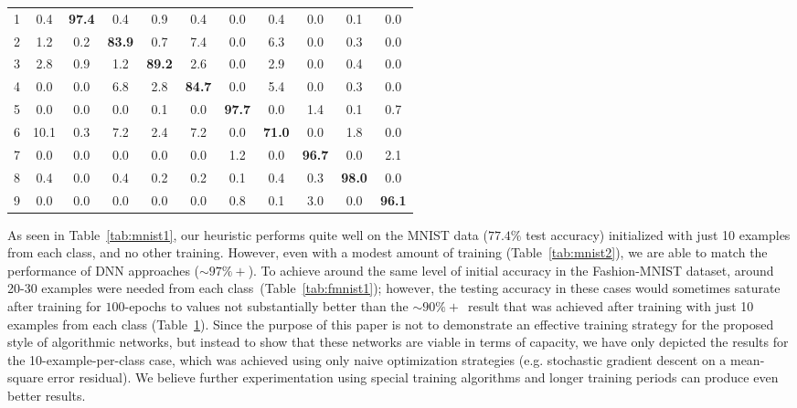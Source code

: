 \documentclass{article}
\begin{document}
\begin{table}[hbt!]
\begin{subtable}{0.5\linewidth}
\begin{tabular}{c| c c c c c c c c c c |}
            1 & 0.4 & \textbf{97.4} & 0.4 & 0.9 & 0.4 & 0.0 & 0.4 & 0.0 & 0.1 & 0.0 \\
            2 & 1.2 & 0.2 & \textbf{83.9} & 0.7 & 7.4 & 0.0 & 6.3 & 0.0 & 0.3 & 0.0 \\
            3 & 2.8 & 0.9 & 1.2 & \textbf{89.2} & 2.6 & 0.0 & 2.9 & 0.0 & 0.4 & 0.0 \\
            4 & 0.0 & 0.0 & 6.8 & 2.8 & \textbf{84.7} & 0.0 & 5.4 & 0.0 & 0.3 & 0.0 \\
            5 & 0.0 & 0.0 & 0.0 & 0.1 & 0.0 & \textbf{97.7} & 0.0 & 1.4 & 0.1 & 0.7 \\
            6 & 10.1 & 0.3 & 7.2 & 2.4 & 7.2 & 0.0 & \textbf{71.0} & 0.0 & 1.8 & 0.0 \\
            7 & 0.0 & 0.0 & 0.0 & 0.0 & 0.0 & 1.2 & 0.0 & \textbf{96.7} & 0.0 & 2.1 \\
            8 & 0.4 & 0.0 & 0.4 & 0.2 & 0.2 & 0.1 & 0.4 & 0.3 & \textbf{98.0} & 0.0 \\
            9 & 0.0 & 0.0 & 0.0 & 0.0 & 0.0 & 0.8 & 0.1 & 3.0 & 0.0 & \textbf{96.1}
        \end{tabular}
         \label{tab:fmnist2}
  \end{subtable}
\vspace{-6mm}
\end{table}

As seen in Table~\ref{tab:mnist1}, our heuristic performs quite well on the MNIST data ($77.4\%$ test accuracy) initialized with just 10 examples from each class, and no other training. However, even with a modest amount of training (Table~\ref{tab:mnist2}), we are able to match the performance of DNN approaches ($\sim97\%+$).
To achieve around the same level of initial accuracy in the Fashion-MNIST dataset, around 20-30 examples were needed from each class~(Table~\ref{tab:fmnist1}); however, the testing accuracy in these cases would sometimes saturate after training for $100$-epochs to values not substantially better than the $\sim90\%+$~result that was achieved after training with just 10 examples from each class (Table~\ref{tab:fmnist2}). Since the purpose of this paper is not to demonstrate an effective training strategy for the proposed style of algorithmic networks, but instead to show that these networks are viable in terms of capacity, we have only depicted the results for the 10-example-per-class case, which was achieved using only naive optimization strategies (e.g. stochastic gradient descent on a mean-square error residual). We believe further experimentation using special training algorithms and longer training periods can produce even better results.
\end{document}
